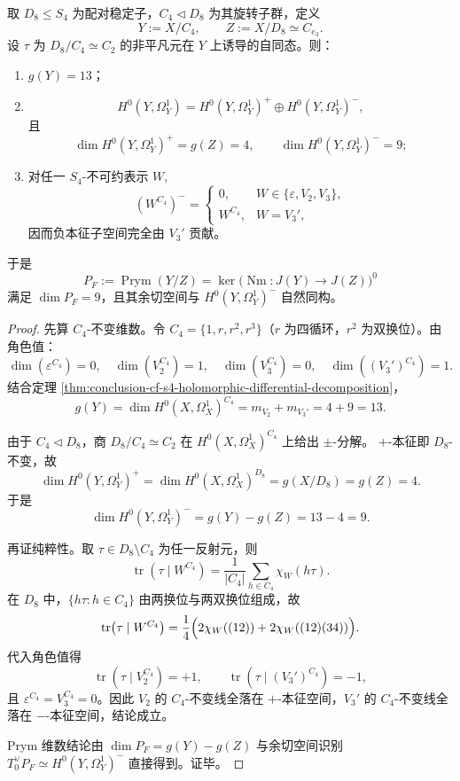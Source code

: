 \begin{proposition}\label{prop:conclusion-cf-c4d8-antiinvariant-prym9}
取 \(D_8\le S_4\) 为配对稳定子，\(C_4\triangleleft D_8\) 为其旋转子群，定义
\[
Y:=X/C_4,\qquad Z:=X/D_8\simeq C_{e_3}.
\]
设 \(\tau\) 为 \(D_8/C_4\simeq C_2\) 的非平凡元在 \(Y\) 上诱导的自同态。则：
\begin{enumerate}
  \item \(g(Y)=13\)；
  \item
  \[
  H^0(Y,\Omega_Y^1)=H^0(Y,\Omega_Y^1)^+\oplus H^0(Y,\Omega_Y^1)^-,
  \]
  且
  \[
  \dim H^0(Y,\Omega_Y^1)^+=g(Z)=4,\qquad
  \dim H^0(Y,\Omega_Y^1)^-=9;
  \]
  \item 对任一 \(S_4\)-不可约表示 \(W\),
  \[
  (W^{C_4})^-=
  \begin{cases}
  0,&W\in\{\varepsilon,V_2,V_3\},\\[2pt]
  W^{C_4},&W=V_3',
  \end{cases}
  \]
  因而负本征子空间完全由 \(V_3'\) 贡献。
\end{enumerate}
于是
\[
P_F:=\operatorname{Prym}(Y/Z)
=\ker\!\bigl(\operatorname{Nm}:J(Y)\to J(Z)\bigr)^0
\]
满足 \(\dim P_F=9\)，且其余切空间与 \(H^0(Y,\Omega_Y^1)^-\) 自然同构。
\end{proposition}
\begin{proof}
先算 \(C_4\)-不变维数。令 \(C_4=\{1,r,r^2,r^3\}\)（\(r\) 为四循环，\(r^2\) 为双换位）。由角色值：
\[
\dim(\varepsilon^{C_4})=0,\quad
\dim(V_2^{C_4})=1,\quad
\dim(V_3^{C_4})=0,\quad
\dim((V_3')^{C_4})=1.
\]
结合定理 \ref{thm:conclusion-cf-s4-holomorphic-differential-decomposition}，
\[
g(Y)=\dim H^0(X,\Omega_X^1)^{C_4}
=m_{V_2}+m_{V_3'}
=4+9=13.
\]

由于 \(C_4\triangleleft D_8\)，商 \(D_8/C_4\simeq C_2\) 在
\(
H^0(X,\Omega_X^1)^{C_4}
\)
上给出 \(\pm\)-分解。
\(+\)-本征即 \(D_8\)-不变，故
\[
\dim H^0(Y,\Omega_Y^1)^+
=\dim H^0(X,\Omega_X^1)^{D_8}
=g(X/D_8)=g(Z)=4.
\]
于是
\[
\dim H^0(Y,\Omega_Y^1)^-
=g(Y)-g(Z)=13-4=9.
\]

再证纯粹性。取 \(\tau\in D_8\setminus C_4\) 为任一反射元，则
\[
\operatorname{tr}\!\left(\tau\mid W^{C_4}\right)
=\frac{1}{|C_4|}\sum_{h\in C_4}\chi_W(h\tau).
\]
在 \(D_8\) 中，\(\{h\tau:h\in C_4\}\) 由两换位与两双换位组成，故
\[
\operatorname{tr}\!\left(\tau\mid W^{C_4}\right)
=\frac14\Bigl(2\chi_W((12))+2\chi_W((12)(34))\Bigr).
\]
代入角色值得
\[
\operatorname{tr}\!\left(\tau\mid V_2^{C_4}\right)=+1,\qquad
\operatorname{tr}\!\left(\tau\mid (V_3')^{C_4}\right)=-1,
\]
且 \(\varepsilon^{C_4}=V_3^{C_4}=0\)。因此 \(V_2\) 的 \(C_4\)-不变线全落在 \(+\)-本征空间，\(V_3'\) 的 \(C_4\)-不变线全落在 \(-\)-本征空间，结论成立。

Prym 维数结论由 \(\dim P_F=g(Y)-g(Z)\) 与余切空间识别
\(
T_0^\vee P_F\simeq H^0(Y,\Omega_Y^1)^-
\)
直接得到。证毕。
\end{proof}


